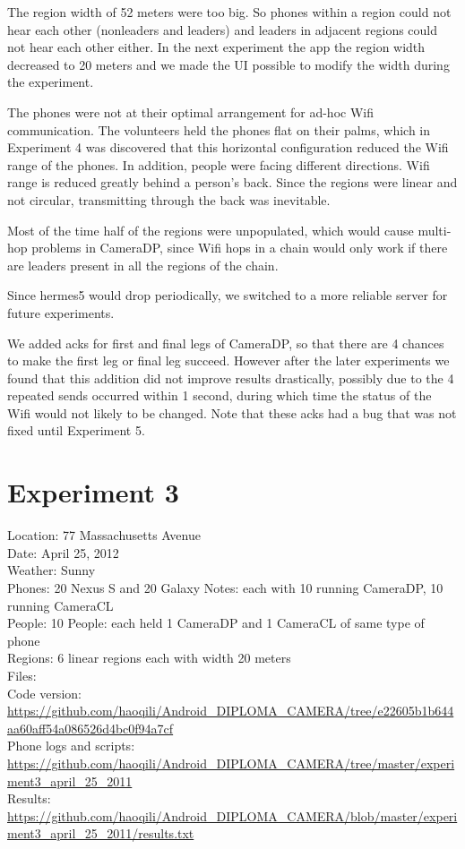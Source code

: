The region width of 52 meters were too big. So phones within a region could not hear each other (nonleaders and leaders) and leaders in adjacent regions could not hear each other either. In the next experiment the app the region width decreased to 20 meters and we made the UI possible to modify the width during the experiment.

The phones were not at their optimal arrangement for ad-hoc Wifi communication. The volunteers held the phones flat on their palms, which in Experiment 4 was discovered that this horizontal configuration reduced the Wifi range of the phones. In addition, people were facing different directions. Wifi range is reduced greatly behind a person's back. Since the regions were linear and not circular, transmitting through the back was inevitable.

Most of the time half of the regions were unpopulated, which would cause multi-hop problems in CameraDP, since Wifi hops in a chain would only work if there are leaders present in all the regions of the chain.

Since hermes5 would drop periodically, we switched to a more reliable server for future experiments.

We added acks for first and final legs of CameraDP, so that there are 4 chances to make the first leg or final leg succeed. However after the later experiments we found that this addition did not improve results drastically, possibly due to the 4 repeated sends occurred within 1 second, during which time the status of the Wifi would not likely to be changed. Note that these acks had a bug that was not fixed until Experiment 5.

\section{Experiment 3}

Location: 77 Massachusetts Avenue\\
Date: April 25, 2012\\
Weather: Sunny\\
Phones: 20 Nexus S and 20 Galaxy Notes: each with 10 running CameraDP, 10 running CameraCL\\
People: 10 People: each held 1 CameraDP and 1 CameraCL of same type of phone\\
Regions: 6 linear regions each with width 20 meters\\
Files:\\
Code version: {\url{https://github.com/haoqili/Android_DIPLOMA_CAMERA/tree/e22605b1b644aa60aff54a086526d4bc0f94a7cf}}\\
Phone logs and scripts: {\url{https://github.com/haoqili/Android_DIPLOMA_CAMERA/tree/master/experiment3_april_25_2011}}\\ 
Results: {\url{https://github.com/haoqili/Android_DIPLOMA_CAMERA/blob/master/experiment3_april_25_2011/results.txt}}\\

